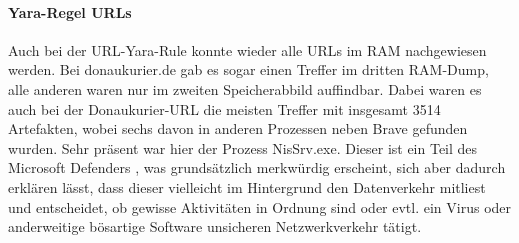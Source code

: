 \paragraph*{Yara-Regel \glqq{}URLs\grqq{}}\label{chap:ergebnisse-brave-uncommon-locations-volatility-urls}

Auch bei der URL-Yara-Rule konnte wieder alle URLs im RAM nachgewiesen werden. Bei \glqq{}donaukurier.de\grqq{} gab es sogar einen Treffer im dritten RAM-Dump, alle anderen waren nur im zweiten Speicherabbild auffindbar. Dabei waren es auch bei der Donaukurier-URL die meisten Treffer mit insgesamt 3514 Artefakten, wobei sechs davon in anderen Prozessen neben Brave gefunden wurden. Sehr präsent war hier der Prozess \glqq{}NisSrv.exe\grqq{}. Dieser ist ein Teil des Microsoft Defenders \cite{pogonin2022microsoft}, was grundsätzlich merkwürdig erscheint, sich aber dadurch erklären lässt, dass dieser vielleicht im Hintergrund den Datenverkehr mitliest und entscheidet, ob gewisse Aktivitäten in Ordnung sind oder evtl. ein Virus oder anderweitige bösartige Software unsicheren Netzwerkverkehr tätigt.

